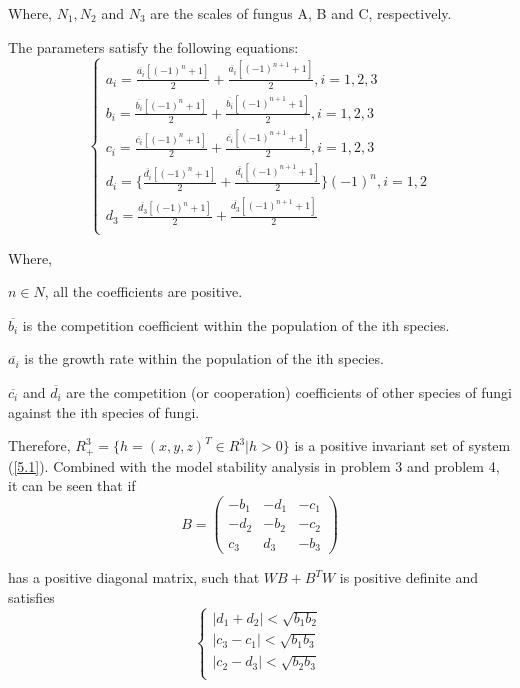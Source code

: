 Where, $N_{1},N_{2}$ and $N_{3}$ are the scales of fungus A, B and C, respectively.

The parameters satisfy the following equations:
\begin{equation}\label{}
    \left\{
    \begin{array}{l}
        a_{i}=\frac{\overline{a_{i}}[(-1)^n+1]}{2}+\frac{\overline{a_{i}}[(-1)^{n+1}+1]}{2},i=1,2,3 \\
        b_{i}=\frac{\overline{b_{i}}[(-1)^n+1]}{2}+\frac{\overline{b_{i}}[(-1)^{n+1}+1]}{2},i=1,2,3 \\
        c_{i}=\frac{\overline{c_{i}}[(-1)^n+1]}{2}+\frac{\overline{c_{i}}[(-1)^{n+1}+1]}{2},i=1,2,3 \\
        d_{i}=\{ \frac{\overline{d_{i}}[(-1)^n+1]}{2}+\frac{\overline{d_{i}}[(-1)^{n+1}+1]}{2}\}(-1)^n,i=1,2 \\
        d_{3}=\frac{\overline{d_{3}}[(-1)^n+1]}{2}+\frac{\overline{d_{3}}[(-1)^{n+1}+1]}{2} \\
    \end{array}
    \right.
    \end{equation}

Where,

$n \in N$, all the coefficients are positive.

$\overline{b_{i}}$ is the competition coefficient within the population of the ith species.

$\overline{a_{i}}$ is the growth rate within the population of the ith species.

$\overline{c_{i}}$ and $\overline{d_{i}}$ are the competition (or cooperation) coefficients of other species of fungi against the ith species of fungi.

Therefore, $R_{+}^3=\{h=(x,y,z)^T\in R^3 | h>0\}$ is a positive invariant set of system (\ref{5.1}). Combined with the model stability analysis in problem 3 and problem 4, it can be seen that if
\begin{equation}\label{}
    B=
    \begin{pmatrix}
        -b_{1} & -d_{1} & -c_{1} \\
        -d_{2} & -b_{2} & -c_{2} \\
        c_{3} & d_{3} & -b_{3}
    \end{pmatrix}
    \end{equation}

has a positive diagonal matrix, such that $WB+B^TW$ is positive definite and satisfies
\begin{equation}\label{}
    \left\{
    \begin{array}{l}
        |d_{1}+d_{2}| < \sqrt{b_{1}b_{2}} \\
        |c_{3}-c_{1}| < \sqrt{b_{1}b_{3}} \\
        |c_{2}-d_{3}| < \sqrt{b_{2}b_{3}} \\
    \end{array}
    \right.
    \end{equation}

